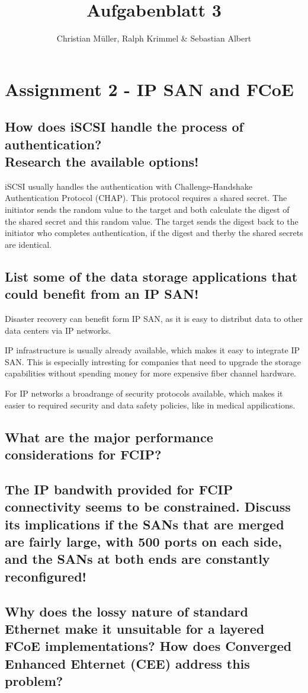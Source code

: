 \documentclass{article}
\title{Aufgabenblatt 3}
\author{Christian Müller, Ralph Krimmel \& Sebastian Albert }
\begin{document}
\maketitle

\section*{Assignment 2 - IP SAN and FCoE}

\subsection{How does iSCSI handle the process of authentication?\\Research the available options!}
	iSCSI usually handles the authentication with Challenge-Handshake Authentication Protocol (CHAP).
	This protocol requires a shared secret.
	The initiator sends the random value to the target 
	and both calculate the digest of the shared secret and this random value.
	The target sends the digest back to the initiator who completes authentication,
	if the digest and therby the shared secrets are identical.

\subsection{List some of the data storage applications that could benefit from an IP SAN!}
	Disaster recovery can benefit form IP SAN,
	as it is easy to distribut data to other data centers via IP networks.

	IP infrastructure is usually already available,
	which makes it easy to integrate IP SAN.
	This is especially intresting for companies that need to upgrade the storage capabilities
	without spending money for more expensive fiber channel hardware.

	For IP networks a broadrange of security protocols available,
	which makes it easier to required security and data safety policies,
	like in medical appilications.

\subsection{What are the major performance considerations for FCIP?}

\subsection{The IP bandwith provided for FCIP connectivity seems to be constrained.
	Discuss its implications if the SANs that are merged are fairly large,
	with 500 ports on each side, and the SANs at both ends are constantly reconfigured!}

\subsection{Why does the lossy nature of standard Ethernet make it unsuitable for a layered FCoE implementations?
	How does Converged Enhanced Ehternet (CEE) address this problem?}
\end{document}

